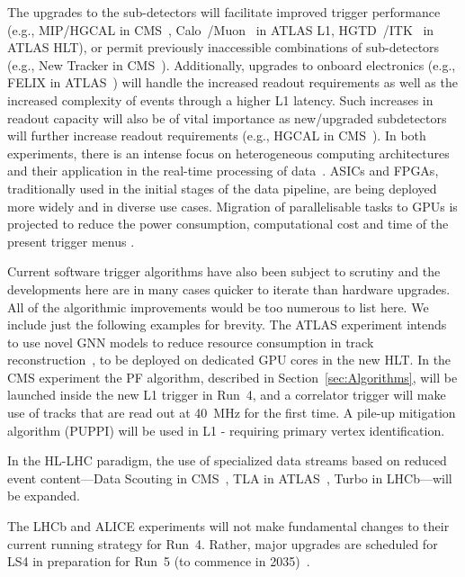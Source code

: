 The upgrades to the sub-detectors will facilitate improved trigger performance (e.g., MIP/HGCAL in CMS~\cite{cms2019mip, cms2017phase-hgcal}, Calo~\cite{ATLAS:ECAL, ATLAS:HCAL}/Muon~\cite{ATLAS:Muon} in ATLAS L1, HGTD~\cite{ATLAS:HGTD}/ITK~\cite{ATLAS:ITKPixel, ATLAS:ITKStrip} in ATLAS HLT), or permit previously inaccessible combinations of sub-detectors (e.g., New Tracker in CMS~\cite{collaboration2017phasecms}). Additionally, upgrades to onboard electronics (e.g., FELIX in ATLAS~\cite{ATLAS:FELIX, ATLAS:TDAQ}) will handle the increased readout requirements as well as the increased complexity of events through a higher L1 latency. Such increases in readout capacity will also be of vital importance as new/upgraded subdetectors will further increase readout requirements (e.g., HGCAL in CMS~\cite{cms2017phase-hgcal}).
In both experiments, there is an intense focus on heterogeneous computing architectures and their application in the real-time processing of data~\cite{ATLAS:c-and-s-roadmap,bocci2020heterogeneouscms}. ASICs and FPGAs, traditionally used in the initial stages of the data pipeline, are being deployed more widely and in diverse use cases. Migration of parallelisable tasks to GPUs is projected to reduce the power consumption, computational cost and time of the present trigger menus \cite{cms-GPU-clustering}. 

Current software trigger algorithms have also been subject to scrutiny and the developments here are in many cases quicker to iterate than hardware upgrades. All of the algorithmic improvements would be too numerous to list here. We include just the following examples for brevity.
The ATLAS experiment intends to use novel GNN models to reduce resource consumption in track reconstruction~\cite{Murnane:2809518, Caillou:2815578}, to be deployed on dedicated GPU cores in the new HLT.
In the CMS experiment the PF algorithm, described in Section~\ref{sec:Algorithms}, will be launched inside the new L1 trigger in Run~4, and a correlator trigger will make use of tracks that are read out at \SI{40}{MHz} for the first time. A pile-up mitigation algorithm (PUPPI) will be used in L1 - requiring primary vertex identification.

In the HL-LHC paradigm, the use of specialized data streams based on reduced event content—Data Scouting in CMS~\cite{ardino202340cms,tomei2003cms,badaro202040cms}, TLA in ATLAS~\cite{ATLAS:TLA}, Turbo in LHCb—will be expanded.



The LHCb and ALICE experiments will not make fundamental changes to their current running strategy for Run~4. Rather, major upgrades are scheduled for LS4 in preparation for Run~5 (to commence in 2035)~\cite{CERN-LHCC-2021-012, alice_loi_hl_lhc}.
